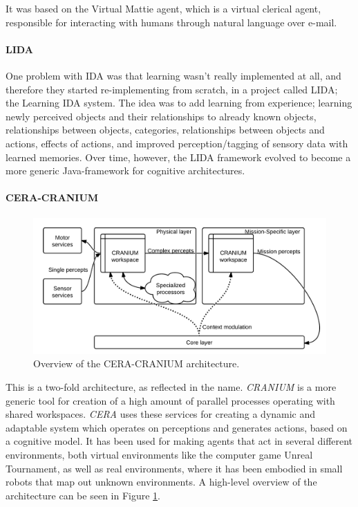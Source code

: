 It was based on the Virtual Mattie agent, which is a virtual clerical agent, responsible for interacting with humans through natural language over e-mail.\cite{franklin1996virtual}

\paragraph{LIDA}
One problem with IDA was that learning wasn't really implemented at all, and therefore they started re-implementing from scratch, in a project called LIDA; the Learning IDA system. The idea was to add learning from experience; learning newly perceived objects and their relationships to already known objects, relationships between objects, categories, relationships between objects and actions, effects of actions, and improved perception/tagging of sensory data with learned memories.\cite{franklin2006lida} Over time, however, the LIDA framework evolved to become a more generic Java-framework for cognitive architectures.\cite{snaider2011lida}

\paragraph{CERA-CRANIUM}
\begin{figure}[h!tb]
\centering
\includegraphics[width=\textwidth]{graphics/ceracranium.png}
\caption{Overview of the CERA-CRANIUM architecture.}
\label{fig:cera-cranium}
\end{figure}
This is a two-fold architecture, as reflected in the name. {\em CRANIUM} is a more generic tool for creation of a high amount of parallel processes operating with shared workspaces. {\em CERA} uses these services for creating a dynamic and adaptable system which operates on perceptions and generates actions, based on a cognitive model.\cite{arrabales2009gamechars} It has been used for making agents that act in several different environments, both virtual environments like the computer game Unreal Tournament, as well as real environments, where it has been embodied in small robots that map out unknown environments. \cite{arrabales2009ceracranium} A high-level overview of the architecture can be seen in Figure \ref{fig:cera-cranium}.

